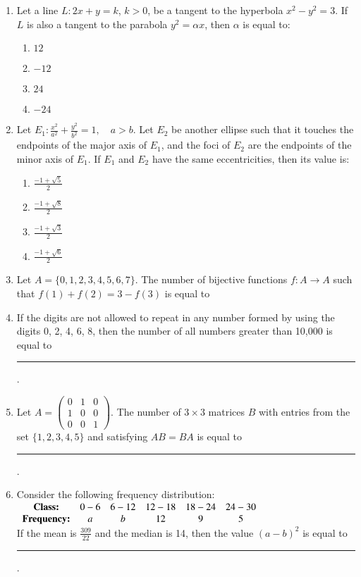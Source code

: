 \documentclass[journal,12pt,onecolumn]{IEEEtran}
\theoremstyle{remark}
\begin{document}
\begin{enumerate}
    \item Let a line $ L : 2x + y = k $, $ k > 0 $, be a tangent to the hyperbola $ x^2 - y^2 = 3 $. If $ L $ is also a tangent to the parabola $ y^2 = \alpha x $, then $ \alpha $ is equal to:
    \begin{enumerate}
        \item $12$
        \item $-12$
        \item $24$
        \item $-24$
    \end{enumerate}

    \item Let $E_1 : \frac{x^2}{a^2} + \frac{y^2}{b^2} = 1, \quad a > b$. Let $ E_2 $ be another ellipse such that it touches the endpoints of the major axis of $ E_1 $, and the foci of $ E_2 $ are the endpoints of the minor axis of $ E_1 $. If $ E_1 $ and $ E_2 $ have the same eccentricities, then its value is:
    \begin{enumerate}
        \item $ \frac{-1 + \sqrt{5}}{2} $
        \item $ \frac{-1 + \sqrt{8}}{2} $
        \item $ \frac{-1 + \sqrt{3}}{2} $
        \item $ \frac{-1 + \sqrt{6}}{2} $
    \end{enumerate}

    \item Let $ A = \{0, 1, 2, 3, 4, 5, 6, 7\} $. The number of bijective functions $ f : A \to A $ such that $ f(1) + f(2) = 3 - f(3) $ is equal to

    \item If the digits are not allowed to repeat in any number formed by using the digits 0, 2, 4, 6, 8, then the number of all numbers greater than 10,000 is equal to \rule{2.5cm}{0.4pt}.

    \item Let $A = 
    \begin{pmatrix}
    0 & 1 & 0 \\
    1 & 0 & 0 \\
    0 & 0 & 1
    \end{pmatrix}.
    $
    The number of $ 3 \times 3 $ matrices $ B $ with entries from the set $ \{1, 2, 3, 4, 5\} $ and satisfying $ AB = BA $ is equal to \rule{2.5cm}{0.4pt}.

    \item Consider the following frequency distribution:\\
    $ \begin{array}{c c c c c c c}
\text{\textbf{Class:}} & 0-6 & 6-12 & 12-18 & 18-24 & 24-30 \\
\text{\textbf{Frequency:}} & a & b & 12 & 9 & 5
\end{array}$\\
    If the mean is $ \frac{309}{22} $ and the median is 14, then the value $ (a - b)^2 $ is equal to \rule{2.5cm}{0.4pt}.


\end{enumerate}
\end{document}
